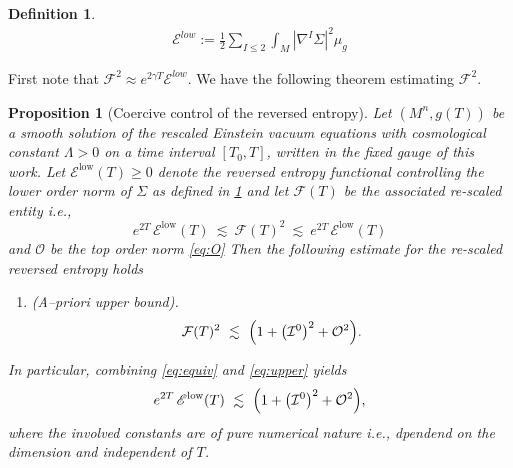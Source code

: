 \documentclass{amsart}
\newtheorem{definition}{Definition}
\newtheorem{proposition}{Proposition}[section]
\begin{document}
\begin{definition}
\label{entropy2}
\begin{align} 
\mathscr{E}^{low}:=\frac{1}{2}\sum_{I\leq 2}\int_{M}|\nabla^{I}\Sigma|^{2}\mu_{g}
\end{align}
\end{definition}
\noindent First note that $\mathcal{F}^{2}\approx e^{2\gamma T}\mathscr{E}^{low}$. We have the following theorem estimating $\mathcal{F}^{2}$.
\begin{proposition}[Coercive control of the reversed entropy]\label{model2}
Let $(M^n,g(T))$ be a smooth solution of the rescaled Einstein vacuum equations with cosmological constant $\Lambda>0$ on a time interval $[T_0,T]$, written in the fixed gauge of this work.  
Let $\mathscr{E}^{\mathrm{low}}(T)\ge0$ denote the reversed entropy functional controlling the lower order norm of $\Sigma$ as defined in \ref{entropy2} and let $\mathcal{F}(T)$ be the associated re-scaled entity i.e., 
\begin{equation}\label{eq:equiv}
e^{2T}\,\mathscr{E}^{\mathrm{low}}(T)\ \lesssim \ \mathcal{F}(T)^2\ \lesssim\ e^{2T}\,\mathscr{E}^{\mathrm{low}}(T)
\end{equation}
and $\mathcal{O}$ be the top order norm \ref{eq:O}
Then the following estimate for the re-scaled reversed entropy holds
\begin{enumerate}
\item[{\normalfont(i)}] (\emph{A–priori upper bound}).  
\begin{equation}\label{eq:upper}
\mathcal{F}(T)^2\ \lesssim\ \Bigl(1+\bigl(\mathcal{I}^{0}\bigr)^{2}+\mathcal{O}^{2}\Bigr).
\end{equation}
\end{enumerate}
In particular, combining \eqref{eq:equiv} and \eqref{eq:upper} yields
\begin{equation}\label{eq:announced}
e^{2T}\,\mathscr{E}^{\mathrm{low}}(T)\ \lesssim\ \Bigl(1+\bigl(\mathcal{I}^{0}\bigr)^{2}+\mathcal{O}^{2}\Bigr),
\end{equation}
where the involved constants are of pure numerical nature i.e., dpendend on the dimension and independent of $T$. 
\end{proposition}
\end{document}
